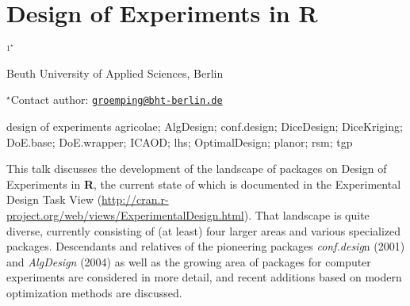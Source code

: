 \documentclass[\main/boa.tex]{subfiles}
\begin{document}
\section{Design of Experiments in R}

\begin{center}
  {\bf {}$^{1^\star}$}
\end{center}

\vskip 0.3cm

\begin{affiliations}
\begin{enumerate}
\begin{minipage}{0.915\textwidth}
\centering
\item Beuth University of Applied Sciences, Berlin \\[-2pt]
\end{minipage}
\end{enumerate}
$^\star$Contact author: \href{mailto:groemping@bht-berlin.de}{\nolinkurl{groemping@bht-berlin.de}}\\
\end{affiliations}

\vskip 0.5cm

\begin{minipage}{0.915\textwidth}
\keywords design of experiments
\packages agricolae; AlgDesign; conf.design; DiceDesign; DiceKriging; DoE.base;
DoE.wrapper; ICAOD; lhs; OptimalDesign; planor; rsm; tgp
\end{minipage}

\vskip 0.8cm

This talk discusses the development of the landscape of packages on
Design of Experiments in \textbf{R}, the current state of which is
documented in the Experimental Design Task View
(\url{http://cran.r-project.org/web/views/ExperimentalDesign.html}).
That landscape is quite diverse, currently consisting of (at least) four
larger areas and various specialized packages. Descendants and relatives
of the pioneering packages \emph{conf.desig}n (2001) and
\emph{AlgDesign} (2004) as well as the growing area of packages for
computer experiments are considered in more detail, and recent additions
based on modern optimization methods are discussed.
\end{document}
